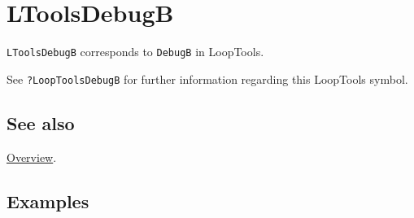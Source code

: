\documentclass[../FeynHelpersManual.tex]{subfiles}
\begin{document}
\hypertarget{ltoolsdebugb}{
\section{LToolsDebugB}\label{ltoolsdebugb}}

\texttt{LToolsDebugB} corresponds to \texttt{DebugB} in LoopTools.

See \texttt{?LoopTools\textasciigrave DebugB} for further information
regarding this LoopTools symbol.

\subsection{See also}

\hyperlink{toc}{Overview}.

\subsection{Examples}
\end{document}
